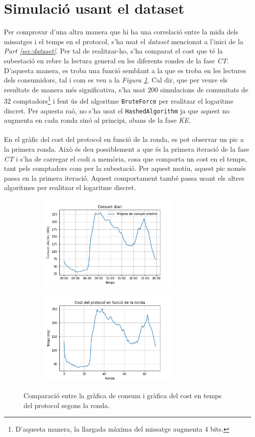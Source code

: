 \section{Simulació usant el dataset}
Per comprovar d'una altra manera que hi ha una correlació entre la mida dels missatges i el temps en el protocol, s'ha usat el \textit{dataset} mencionat a l'inici de la \textit{Part \ref{sec:dataset}}. Per tal de realitzar-ho, s'ha comparat el cost que té la subestació en rebre la lectura general en les diferents rondes de la fase \textit{CT}. D'aquesta manera, es troba una funció semblant a la que es troba en les lectures dels consumidors, tal i com es veu a la \textit{Figura \ref{fig:cost-kaggle}}. Cal dir, que per veure els resultats de manera més significativa, s'ha usat $200$ simulacions de comunitats de $32$ comptadors\footnote{D'aquesta manera, la llargada màxima del missatge augmenta 4 bits.} i fent ús del algoritme \texttt{BruteForce} per realitzar el logaritme discret. Per aquesta raó, no s'ha usat el \texttt{HashedAlgorithm} ja que aquest no augmenta en cada ronda sinó al principi, abans de la fase \textit{KE}.
\\
\\
En el gràfic del cost del protocol en funció de la ronda, es pot observar un pic a la primera ronda. Això és deu possiblement a que és la primera iteració de la fase \textit{CT} i s'ha de carregar el codi a memòria, cosa que comporta un cost en el temps, tant pels comptadors com per la subestació. Per aquest motiu, aquest pic només passa en la primera iteració. Aquest comportament també passa usant els altres algoritmes per realitzar el logaritme discret.
\begin{figure}[H]
	
	\centering
	\begin{subfigure}[b]{0.48\textwidth}
		\centering
		\includegraphics[width=7cm]{imgs/cost/consumption.png}
	\end{subfigure}
	\begin{subfigure}[b]{0.48\textwidth}
		\centering
		\includegraphics[width=7cm]{imgs/cost/16compt-dataset.png}
	\end{subfigure}
	\caption{Comparació entre la gràfica de consum i gràfica del cost en temps del protocol segons la ronda.}
	\label{fig:cost-kaggle}
	\centering
\end{figure}
